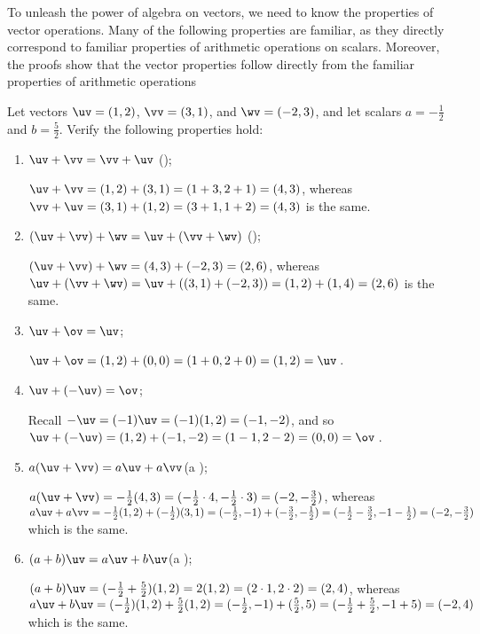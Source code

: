 To unleash the power of algebra on vectors, we need to know the properties of vector operations.
Many of the following properties are familiar, as they directly correspond to familiar properties of arithmetic operations on scalars.
Moreover, the proofs show that the vector properties follow directly from the familiar properties of arithmetic operations 

\begin{example} 
Let vectors \(\uv=(1,2)\), \(\vv=(3,1)\), and \(\wv=(-2,3)\), and let scalars \(a=-\tfrac12\) and \(b=\tfrac52\).
Verify the following properties hold:
\begin{enumerate}
\item \(\uv+\vv=\vv+\uv\) \quad();
\begin{solution} 
\(\uv+\vv=(1,2)+(3,1) =(1+3,2+1) =(4,3)\), whereas \(\vv+\uv =(3,1)+(1,2) =(3+1,1+2)=(4,3)\) is the same. 
\end{solution}

\item \((\uv+\vv)+\wv=\uv+(\vv+\wv)\) \quad();
\begin{solution} 
\((\uv+\vv)+\wv =(4,3)+(-2,3) =(2,6)\), whereas 
\(\uv+(\vv+\wv) =\uv+((3,1)+(-2,3)) =(1,2)+(1,4) =(2,6)\) is the same.
\end{solution}

\item \(\uv+\ov=\uv\);
\begin{solution} 
\(\uv+\ov=(1,2)+(0,0)=(1+0,2+0)=(1,2)=\uv\)\,. 
\end{solution}

\item \(\uv+(-\uv)=\ov\);
\begin{solution} 
Recall \(-\uv=(-1)\uv=(-1)(1,2)=(-1,-2)\), and so \(\uv+(-\uv) =(1,2)+(-1,-2)=(1-1,2-2)=(0,0)=\ov\)\,. 
\end{solution}

\item \(a(\uv+\vv)=a\uv+a\vv\)\quad(a );
\begin{solution} 
\(a(\uv+\vv)=-\tfrac12(4,3) =(-\tfrac12\cdot4,-\tfrac12\cdot3) =(-2,-\tfrac32)\), whereas \(a\uv+a\vv =-\tfrac12(1,2)+(-\tfrac12)(3,1) =(-\tfrac12,-1)+(-\tfrac32,-\tfrac12) =(-\tfrac12-\tfrac32,-1-\tfrac12) =(-2,-\tfrac32)\) which is the same.
\end{solution}

\item \((a+b)\uv=a\uv+b\uv\)\quad(a );
\begin{solution} 
\((a+b)\uv=(-\tfrac12+\tfrac52)(1,2) =2(1,2) =(2\cdot1,2\cdot2) =(2,4)\), whereas \(a\uv+b\uv = (-\tfrac12)(1,2)+\tfrac52(1,2) =(-\tfrac12,-1)+(\tfrac52,5) =(-\tfrac12+\tfrac52,-1+5) =(-2,4)\) which is the same.
\end{solution}


\end{enumerate}
\end{example}
